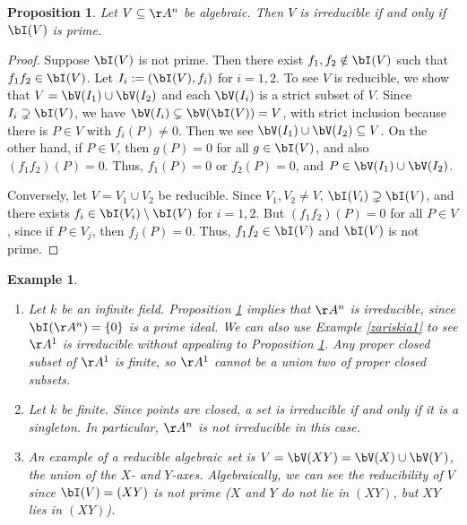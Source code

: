 \documentclass[12pt]{amsart}
\theoremstyle{plain}
\newtheorem{proposition}[theorem]{Proposition}
\newtheorem{example}[theorem]{Example}
\begin{document}
\begin{proposition}\label{irreducibilityproposition}
Let $V \subseteq \AA^n$ be algebraic.
Then $V$ is irreducible if and only if $\bI(V)$ is prime.
\end{proposition}
\begin{proof}
Suppose $\bI(V)$ is not prime.
Then there exist $f_1, f_2 \notin \bI(V)$ such that $f_1 f_2 \in \bI(V)$.
Let $I_i := (\bI(V), f_i)$ for $i=1, 2$.
To see $V$ is reducible, we show that $V = \bV(I_1) \cup \bV(I_2)$ and each $\bV(I_i)$ is a strict subset of $V$.
Since $I_i \supsetneq \bI(V)$, we have $\bV(I_i) \subsetneq \bV(\bI(V)) = V$, with strict inclusion because there is $P \in V$ with $f_i(P) \ne 0$.
Then we see $\bV(I_1) \cup \bV(I_2) \subseteq V$.
On the other hand, if $P \in V$, then $g(P) = 0$ for all $g \in \bI(V)$, and also $(f_1 f_2)(P) = 0$.
Thus, $f_1(P) = 0$ or $f_2(P)=0$, and $P \in \bV(I_1) \cup \bV(I_2)$.

Conversely, let $V = V_1 \cup V_2$ be reducible.
Since $V_1, V_2 \ne V$, $\bI(V_i) \supsetneq \bI(V)$, and there exists $f_i \in \bI(V_i) \setminus \bI(V)$ for $i=1,2$.
But $(f_1 f_2)(P) = 0$ for all $P \in V$, since if $P \in V_j$, then $f_j(P) = 0$.
Thus, $f_1 f_2 \in \bI(V)$ and $\bI(V)$ is not prime.
\end{proof}

\begin{example}
\begin{enumerate}
\item
Let $k$ be an infinite field.
Proposition \ref{irreducibilityproposition} implies that $\AA^n$ is irreducible, since $\bI(\AA^n) = \{0\}$ is a prime ideal.
We can also use Example \ref{zariskia1} to see $\AA^1$ is irreducible without appealing to Proposition \ref{irreducibilityproposition}.
Any proper closed subset of $\AA^1$ is finite, so $\AA^1$ cannot be a union two of proper closed subsets.

\item
Let $k$ be finite.
Since points are closed, a set is irreducible if and only if it is a singleton.
In particular, $\AA^n$ is not irreducible in this case.

\item
An example of a reducible algebraic set is $V = \bV(XY) = \bV(X) \cup \bV(Y)$, the union of the $X$- and $Y$-axes.
Algebraically, we can see the reducibility of $V$ since $\bI(V) = (XY)$ is not prime
($X$ and $Y$ do not lie in $(XY)$, but $XY$ lies in $(XY)$).
\end{enumerate}
\end{example}
\end{document}
